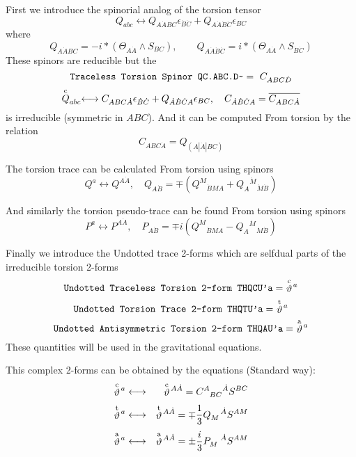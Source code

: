 \documentclass[twoside,openright]{report}
\newcommand{\grgtt}{\ttfamily}
\newcommand{\object}[2]{%
\begin{equation}
\mbox{\comm{#1}} =\ #2
\end{equation}}
\newcommand{\tsst}{\longleftrightarrow}
\newcommand{\pref}[1]{page \pageref{#1}}
\newcommand{\seethis}[1]{\marginpar{\footnotesize\it #1}}
\renewcommand{\tt}{\grgtt}
\newcommand{\cc}{{\tt \char'176}}           %
\newcommand{\comm}[1]{{\upshape\tt#1}}    %
\begin{document}
First we introduce the spinorial analog of the torsion tensor
\begin{equation}
Q_{abc}\tsst Q_{A\dot{A} BC}\epsilon_{\dot{B}\dot{C}}
+Q_{A\dot{A}\dot{B}\dot{C}}\epsilon_{BC}
\end{equation}
where
\begin{equation}
Q_{A\dot{A} BC}=-i*(\Theta_{A\dot{A}}\wedge S_{BC}),\qquad
Q_{A\dot{A}\dot{B}\dot{C}}=i*(\Theta_{A\dot{A}}\wedge S_{\dot{B}\dot{C}})
\end{equation}
These spinors are reducible but the
\object{Traceless Torsion Spinor  QC.ABC.D\cc}{C_{ABC\dot D}}
\[
\stackrel{\rm c}{Q}_{abc}\tsst C_{ABC\dot A}\epsilon_{\dot{B}\dot{C}}
+Q_{\dot{A}\dot{B}\dot{C}A}\epsilon_{BC},\quad
C_{\dot{A}\dot{B}\dot{C} A}=\overline{C_{ABC\dot{A}}}
\]
is irreducible (symmetric in $\scriptstyle ABC$). And it can be
computed {\tt From torsion} by the relation
\begin{equation}
C_{ABC\dot A} = Q_{(A|\dot{A}|BC)}
\end{equation}

The torsion trace can be calculated {\tt From torsion using spinors}
\begin{equation}
Q^a\tsst Q^{A\dot{A}},\quad
Q_{A\dot{B}}=\mp(Q^M{}_{\dot{B}MA}+Q_A{}^{\dot M}{}_{\dot M\dot{B}})
\end{equation}

And similarly the torsion pseudo-trace can be found
{\tt From torsion using spinors}
\begin{equation}
P^a\tsst P^{A\dot{A}},\quad
P_{A\dot{B}}=\mp i(Q^M{}_{\dot{B}MA}-Q_A{}^{\dot M}{}_{\dot M\dot{B}})
\end{equation}

Finally we introduce the {\tt Undotted trace 2-forms}
which are selfdual parts of the irreducible torsion 2-forms
\object{Undotted Traceless Torsion 2-form       THQCU'a}
{\stackrel{\rm c}{\vartheta}\!{}^a}
\object{Undotted Torsion Trace 2-form           THQTU'a}
{\stackrel{\rm t}{\vartheta}\!{}^a}
\object{Undotted Antisymmetric Torsion 2-form   THQAU'a}
{\stackrel{\rm a}{\vartheta}\!{}^a} \seethis{See \pref{thetau}.}
These quantities will be used in the gravitational equations.

This complex 2-forms can be obtained by the equations
({\tt Standard way}):
\begin{eqnarray}
\stackrel{\rm c}{\vartheta}\!{}^a &\tsst& \stackrel{\rm c}{\vartheta}\!{}^{A\dot A}
=C^A_{\ \ BC}{}^{\dot{A}}S^{BC}\\[1mm]
\stackrel{\rm t}{\vartheta}\!{}^a &\tsst& \stackrel{\rm t}{\vartheta}\!{}^{A\dot A}
=\mp\frac13 Q_{M}^{\ \ \ \dot{A}}S^{AM}\\[1mm]
\stackrel{\rm a}{\vartheta}\!{}^a &\tsst& \stackrel{\rm a}{\vartheta}\!{}^{A\dot A}
=\pm\frac{i}3 P_{M}^{\ \ \ \dot{A}}S^{AM}
\end{eqnarray}
\end{document}
